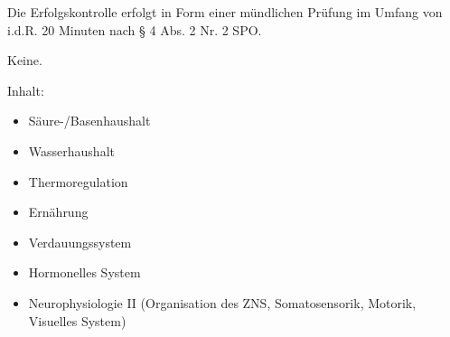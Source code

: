 \begin{course}

\setdoclanguagegerman
{}



\coursehead


\label{cour_8143.dp_997}


\begin{styleenv}
\begin{assessment}
Die Erfolgskontrolle erfolgt in Form einer mündlichen Prüfung im Umfang von i.d.R. 20 Minuten nach § 4 Abs. 2 Nr. 2 SPO.


\end{assessment}

\begin{conditions}Keine.\end{conditions}


\end{styleenv}

\begin{learningoutcomes}

\end{learningoutcomes}

\begin{content}
Inhalt:

 \begin{itemize}\item Säure-/Basenhaushalt  \item Wasserhaushalt  \item Thermoregulation  \item Ernährung  \item Verdauungssystem  \item Hormonelles System  \item Neurophysiologie II (Organisation des ZNS, Somatosensorik, Motorik, Visuelles System)  \end{itemize}
\end{content}







\end{course}
